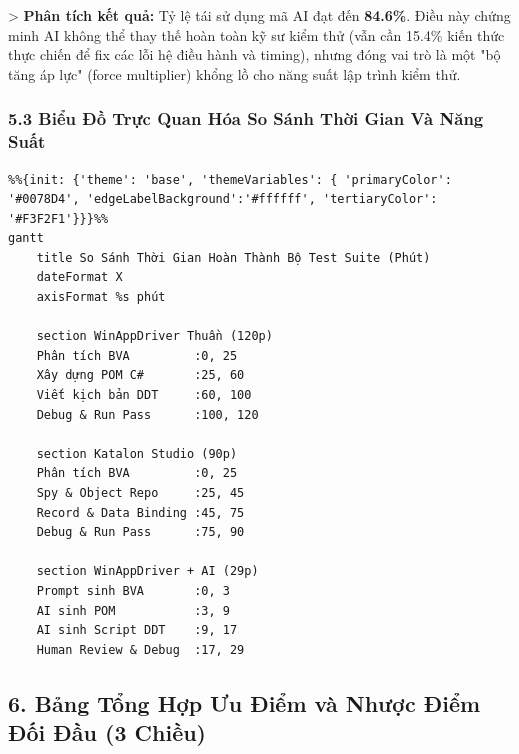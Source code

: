 > \textbf{Phân tích kết quả:} Tỷ lệ tái sử dụng mã AI đạt đến \textbf{84.6\%}. Điều này chứng minh AI không thể thay thế hoàn toàn kỹ sư kiểm thử (vẫn cần 15.4\% kiến thức thực chiến để fix các lỗi hệ điều hành và timing), nhưng đóng vai trò là một "bộ tăng áp lực" (force multiplier) khổng lồ cho năng suất lập trình kiểm thử.

\subsubsection{5.3 Biểu Đồ Trực Quan Hóa So Sánh Thời Gian Và Năng Suất}

\begin{lstlisting}
%%{init: {'theme': 'base', 'themeVariables': { 'primaryColor': '#0078D4', 'edgeLabelBackground':'#ffffff', 'tertiaryColor': '#F3F2F1'}}}%%
gantt
    title So Sánh Thời Gian Hoàn Thành Bộ Test Suite (Phút)
    dateFormat X
    axisFormat %s phút
    
    section WinAppDriver Thuần (120p)
    Phân tích BVA         :0, 25
    Xây dựng POM C#       :25, 60
    Viết kịch bản DDT     :60, 100
    Debug & Run Pass      :100, 120
    
    section Katalon Studio (90p)
    Phân tích BVA         :0, 25
    Spy & Object Repo     :25, 45
    Record & Data Binding :45, 75
    Debug & Run Pass      :75, 90
    
    section WinAppDriver + AI (29p)
    Prompt sinh BVA       :0, 3
    AI sinh POM           :3, 9
    AI sinh Script DDT    :9, 17
    Human Review & Debug  :17, 29
\end{lstlisting}



\subsection{6. Bảng Tổng Hợp Ưu Điểm và Nhược Điểm Đối Đầu (3 Chiều)}

